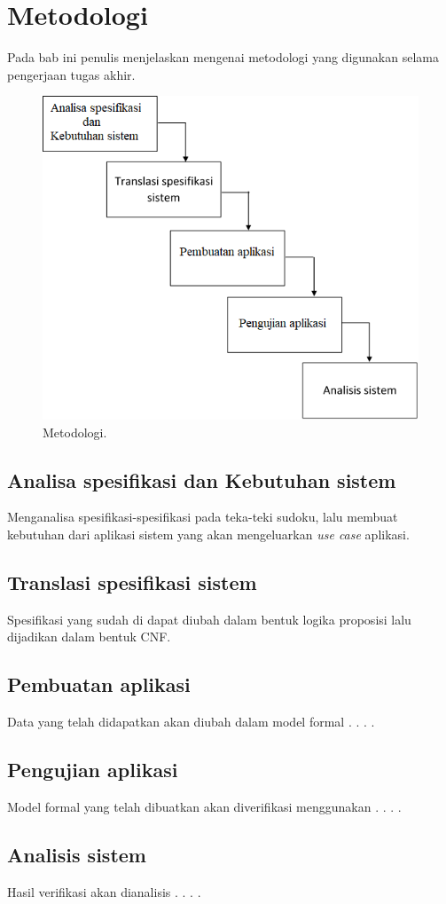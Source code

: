 \chapter{Metodologi}

Pada bab ini penulis menjelaskan mengenai metodologi yang digunakan selama pengerjaan tugas akhir.

\begin{figure}[H]
	\begin{centering}
		\includegraphics[scale=0.7]{metodologi_proposal}
		
		\caption{Metodologi.}
	\end{centering}
\end{figure}

\section{Analisa spesifikasi dan Kebutuhan sistem}

Menganalisa spesifikasi-spesifikasi pada teka-teki sudoku, lalu membuat kebutuhan dari aplikasi sistem yang akan mengeluarkan \textit{use case} aplikasi.

\section{Translasi spesifikasi sistem}

Spesifikasi yang sudah di dapat diubah dalam bentuk logika proposisi lalu dijadikan dalam bentuk CNF.

\section{Pembuatan aplikasi}

Data yang telah didapatkan akan diubah dalam model formal . . . .

\section{Pengujian aplikasi}

Model formal yang telah dibuatkan akan diverifikasi menggunakan . . . .

\section{Analisis sistem}

Hasil verifikasi akan dianalisis . . . .